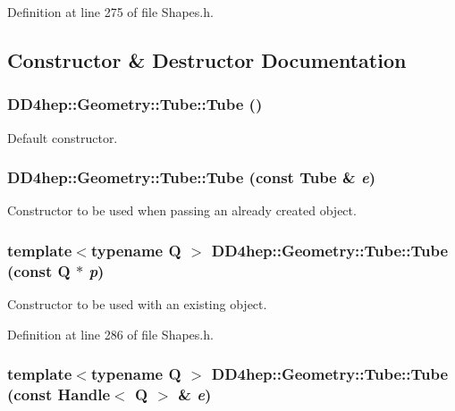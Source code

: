 Definition at line 275 of file Shapes.h.

\subsection{Constructor \& Destructor Documentation}
\hypertarget{class_d_d4hep_1_1_geometry_1_1_tube_af19332dbaf81aacd17bd47daebf3753f}{
\subsubsection[{Tube}]{\setlength{\rightskip}{0pt plus 5cm}DD4hep::Geometry::Tube::Tube ()}}
\label{class_d_d4hep_1_1_geometry_1_1_tube_af19332dbaf81aacd17bd47daebf3753f}


Default constructor. \hypertarget{class_d_d4hep_1_1_geometry_1_1_tube_a9124113381205107d88062a5c9ae6673}{
\subsubsection[{Tube}]{\setlength{\rightskip}{0pt plus 5cm}DD4hep::Geometry::Tube::Tube (const {\bf Tube} \& {\em e})}}
\label{class_d_d4hep_1_1_geometry_1_1_tube_a9124113381205107d88062a5c9ae6673}


Constructor to be used when passing an already created object. \hypertarget{class_d_d4hep_1_1_geometry_1_1_tube_a98cdd89204ddf996eee964d580005dd9}{
\subsubsection[{Tube}]{\setlength{\rightskip}{0pt plus 5cm}template$<$typename Q $>$ DD4hep::Geometry::Tube::Tube (const Q $\ast$ {\em p})}}
\label{class_d_d4hep_1_1_geometry_1_1_tube_a98cdd89204ddf996eee964d580005dd9}


Constructor to be used with an existing object. 

Definition at line 286 of file Shapes.h.\hypertarget{class_d_d4hep_1_1_geometry_1_1_tube_ac665edcfb3f8294d2fbea28777b7ab4b}{
\subsubsection[{Tube}]{\setlength{\rightskip}{0pt plus 5cm}template$<$typename Q $>$ DD4hep::Geometry::Tube::Tube (const {\bf Handle}$<$ Q $>$ \& {\em e})}}
\label{class_d_d4hep_1_1_geometry_1_1_tube_ac665edcfb3f8294d2fbea28777b7ab4b}


